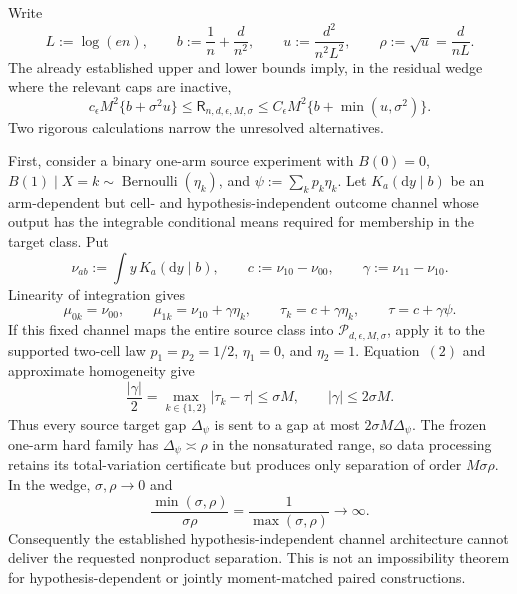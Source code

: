 Write
\[
 L:=\log(en),\qquad b:=\frac1n+\frac d{n^2},\qquad
 u:=\frac{d^2}{n^2L^2},\qquad \rho:=\sqrt u=\frac d{nL}.
\]
The already established upper and lower bounds imply, in the residual wedge where the relevant caps are inactive,
\[
 c_{\epsilon}M^2\{b+\sigma^2u\}
 \le \mathsf R_{n,d,\epsilon,M,\sigma}
 \le C_{\epsilon}M^2\{b+\min(u,\sigma^2)\}.
\tag{1}
\]
Two rigorous calculations narrow the unresolved alternatives.

First, consider a binary one-arm source experiment with \(B(0)=0\), \(B(1)\mid X=k\sim\operatorname{Bernoulli}(\eta_k)\), and \(\psi:=\sum_kp_k\eta_k\). Let \(K_a(\mathrm dy\mid b)\) be an arm-dependent but cell- and hypothesis-independent outcome channel whose output has the integrable conditional means required for membership in the target class. Put
\[
 \nu_{ab}:=\int y\,K_a(\mathrm dy\mid b),\qquad
 c:=\nu_{10}-\nu_{00},\qquad \gamma:=\nu_{11}-\nu_{10}.
\]
Linearity of integration gives
\[
 \mu_{0k}=\nu_{00},\qquad
 \mu_{1k}=\nu_{10}+\gamma\eta_k,\qquad
 \tau_k=c+\gamma\eta_k,\qquad
 \tau=c+\gamma\psi.
\tag{2}
\]
If this fixed channel maps the entire source class into \(\mathcal P_{d,\epsilon,M,\sigma}\), apply it to the supported two-cell law \(p_1=p_2=1/2\), \(\eta_1=0\), and \(\eta_2=1\). Equation~\((2)\) and approximate homogeneity give
\[
 \frac{|\gamma|}{2}
 =\max_{k\in\{1,2\}}|\tau_k-\tau|
 \le \sigma M,
 \qquad |\gamma|\le2\sigma M.
\tag{3}
\]
Thus every source target gap \(\Delta_{\psi}\) is sent to a gap at most \(2\sigma M\Delta_{\psi}\). The frozen one-arm hard family has \(\Delta_{\psi}\asymp\rho\) in the nonsaturated range, so data processing retains its total-variation certificate but produces only separation of order \(M\sigma\rho\). In the wedge, \(\sigma,\rho\to0\) and
\[
 \frac{\min(\sigma,\rho)}{\sigma\rho}
 =\frac1{\max(\sigma,\rho)}\longrightarrow\infty.
\tag{4}
\]
Consequently the established hypothesis-independent channel architecture cannot deliver the requested nonproduct separation. This is not an impossibility theorem for hypothesis-dependent or jointly moment-matched paired constructions.

